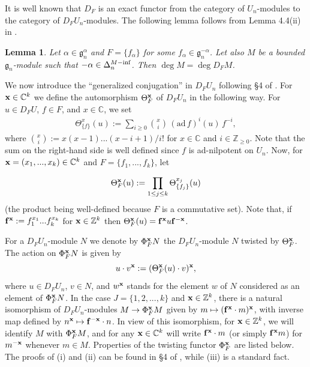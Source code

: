 \documentclass[12pt]{amsart}
\def\gg{\mathfrak{g}}
\newtheorem{lem}[thm]{Lemma}
\begin{document}
It is well known that ${D}_{F}$ is an exact functor from the category of  $U_n$-modules to the category of ${D}_{F} {U_n}$-modules. The following lemma follows from Lemma 4.4(ii) in \cite{M}.

\begin{lem} \label{lem-loc-sl2} Let $\alpha \in \gg_n^{\alpha}$ and $F = \{ f_{\alpha} \}$ for some $f_{\alpha} \in \gg_n^{-\alpha}$. Let also $M$ be a bounded $\gg_n$-module such that $-\alpha \in \Delta_n^{M{\rm -inf}}$. Then $\deg M = \deg D_F M$.
\end{lem}


We now introduce the  ``generalized conjugation'' in $D_F U_n$ following \S 4 of \cite{M}. For ${\bf x}  \in {\mathbb C}^{k}$ we define the automorphism $\Theta_F^{\bf x}$ of 
${D}_{F}  U_n $ in the following way.  For $u
\in {D}_{F}U$, $f \in F$, and $x \in {\mathbb C}$, we set
\begin{eqnarray*}
\Theta_{\{f\}}^{x}(u):= \sum\limits_{
i \geq 0} \binom{x}{i} \,(\mbox{ad}\,f)^{i} (u) \,f^{-i},
\end{eqnarray*}
 where $\binom{x}{i} :=
x(x-1)...(x-i+1)/i!$ for $x \in {\mathbb C}$ and $i \in {\mathbb Z}_{\geq 0}$. Note that the sum on the right-hand side is well defined since $f$ is ad-nilpotent on $U_n$. Now, for  ${\bf x}  = (x_1,...,x_k) \in {\mathbb C}^k$ and $F = \{ f_1,...,f_k\}$, let

\begin{eqnarray*}
\Theta_{F}^{{\bf x}}(u): =\prod_{1\leq j \leq k} \Theta_{\{f_j\}}^{x_j}(u) 
\end{eqnarray*}
(the product being well-defined because $F$ is a commutative set). Note that, if ${\bf f}^{\bf x}:=f_{1}^{x_1}...f_{k}^{x_k}$ for ${\bf x} \in {\mathbb Z}^k$ then  $\Theta_{F}^{\bf x}(u) = {\bf f}^{\mathbf x}u {\bf f}^{-\mathbf{x}}$.

For a
${D}_{F} U_n$-module $N$ we denote by $\Phi^{\bf x}_{F} N$ 
the ${D}_{F} {U_n}$-module $N$ twisted by $\Theta_{F}^{\bf x}$.  The action on  $\Phi^{\bf x}_{F} N$ is given by
 $$
u \cdot v^{\bf x} :=
 ( \Theta_{F}^{\bf x}(u)\cdot v)^{\bf x},
$$
where $u \in {D}_{F} {U_n}$, $v \in N$, and $w^{\bf x}$
stands for the element $w$ of $N$ considered as an element of
$\Phi^{\bf x}_{F} N$.
In the case $J = \{1,2,...,k \}$ and ${\bf x} \in {\mathbb Z}^k$, there is a natural isomorphism of ${D}_{F} {U_n}$-modules $M \to \Phi_{F}^{\bf x} M$ given by $m \mapsto ({\bf f}^{\bf x} \cdot m)^{\bf x}$, with inverse map defined by $n^{\bf x} \mapsto {\bf f}^{-\bf{x}} \cdot n$.
In view of this isomorphism, for ${\bf x} \in {\mathbb Z}^k$, we will identify $M$ with  $\Phi_{F}^{\bf x}M$, and for any ${\bf x} \in {\mathbb C}^k$ will write ${\bf f}^{\bf x} \cdot m$ (or simply ${\bf f}^{\bf x} m$) for $m^{-\bf{x}}$ whenever $m \in M$.  Properties of the twisting functor $\Phi_{F}^{\bf x}$ are listed below. The proofs of (i) and (ii) can be found in \S 4  of \cite{M}, while (iii) is a standard fact.
\end{document}
